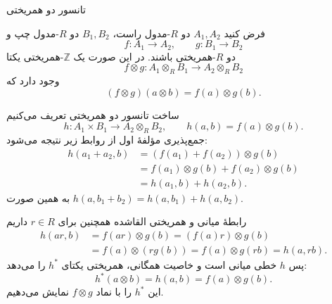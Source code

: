 \begin{frame}[t]{تانسور دو همریختی}
    \label{lec19:induced-map}
    \begin{theorem}
    فرض کنید $A_1,A_2$ دو $R$-مدول راست، $B_1,B_2$ دو $R$-مدول چپ و
    \[
        f:A_1\longrightarrow A_2,\qquad
        g:B_1\longrightarrow B_2
    \]
    دو $R$-همریختی باشند. در این صورت یک $\mathbb Z$-همریختی یکتا
    \[
        f\otimes g:A_1\otimes_R B_1\longrightarrow A_2\otimes_R B_2
    \]
    وجود دارد که
    \[
        (f\otimes g)(a\otimes b)=f(a)\otimes g(b).
    \]
    \end{theorem}
\end{frame}

\begin{frame}[t]{ساخت تانسور دو همریختی}
    \label{lec19:induced-map-proof}
    تعریف می‌کنیم
    \[
        h:A_1\times B_1\longrightarrow A_2\otimes_R B_2,
        \qquad h(a,b)=f(a)\otimes g(b).
    \]
    جمع‌پذیری مؤلفهٔ اول از روابط زیر نتیجه می‌شود:
    \[
    \begin{aligned}
        h(a_1+a_2,b)
        &=(f(a_1)+f(a_2))\otimes g(b)\\
        &=f(a_1)\otimes g(b)+f(a_2)\otimes g(b)\\
        &=h(a_1,b)+h(a_2,b).
    \end{aligned}
    \]
    به همین صورت $h(a,b_1+b_2)=h(a,b_1)+h(a,b_2)$.
\end{frame}

\begin{frame}[t]{رابطهٔ میانی و همریختی القاشده}
    \label{lec19:induced-map-balance}
    همچنین برای $r\in R$ داریم
    \[
    \begin{aligned}
        h(ar,b)
        &=f(ar)\otimes g(b)=(f(a)r)\otimes g(b)\\
        &=f(a)\otimes(rg(b))
          =f(a)\otimes g(rb)=h(a,rb).
    \end{aligned}
    \]
    پس $h$ خطی میانی است و خاصیت همگانی، همریختی یکتای $h^*$ را می‌دهد:
    \[
        h^*(a\otimes b)=h(a,b)=f(a)\otimes g(b).
    \]
    این $h^*$ را با نماد $f\otimes g$ نمایش می‌دهیم.
\end{frame}


